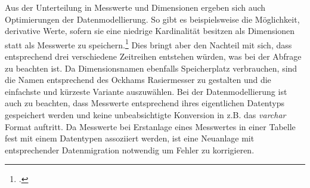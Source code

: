 Aus der Unterteilung in Messwerte und Dimensionen ergeben sich auch Optimierungen der Datenmodellierung. So gibt es beispielsweise die Möglichkeit, derivative Werte, sofern sie eine niedrige Kardinalität besitzen als Dimensionen statt als Messwerte zu speichern.\footcite[Vgl. auch im Folgenden][]{AmazonWebServicesInc..o.J.bt} Dies bringt aber den Nachteil mit sich, dass entsprechend drei verschiedene Zeitreihen entstehen würden, was bei der Abfrage zu beachten ist. Da Dimensionsnamen ebenfalls Speicherplatz verbrauchen, sind die Namen entsprechend des Ockhams Rasiermesser zu gestalten und die einfachste und kürzeste Variante auszuwählen. Bei der Datenmodellierung ist auch zu beachten, dass Messwerte entsprechend ihres eigentlichen Datentyps gespeichert werden und keine unbeabsichtigte Konversion in z.B. das \textit{varchar} Format auftritt. Da Messwerte bei Erstanlage eines Messwertes in einer Tabelle fest mit einem Datentypen assoziiert werden, ist eine Neuanlage mit entsprechender Datenmigration notwendig um Fehler zu korrigieren.




